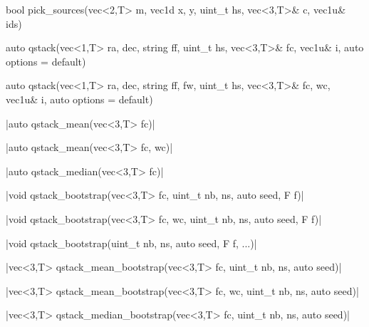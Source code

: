 \item {} \begin{cppcode}
bool pick_sources(vec<2,T> m, vec1d x, y, uint_t hs,
                  vec<3,T>& c, vec1u& ids)
\end{cppcode}

\item {} \begin{cppcode}
auto qstack(vec<1,T> ra, dec, string ff, uint_t hs, vec<3,T>& fc,
            vec1u& i, auto options = default)
\end{cppcode}

\begin{cppcode}
auto qstack(vec<1,T> ra, dec, string ff, fw, uint_t hs,
            vec<3,T>& fc, wc, vec1u& i, auto options = default)
\end{cppcode}

\item \cppinline|auto qstack_mean(vec<3,T> fc)| 

\cppinline|auto qstack_mean(vec<3,T> fc, wc)|

\item \cppinline|auto qstack_median(vec<3,T> fc)| 

\item \cppinline|void qstack_bootstrap(vec<3,T> fc, uint_t nb, ns, auto seed, F f)| 

\cppinline|void qstack_bootstrap(vec<3,T> fc, wc, uint_t nb, ns, auto seed, F f)|

\cppinline|void qstack_bootstrap(uint_t nb, ns, auto seed, F f, ...)|

\item \cppinline|vec<3,T> qstack_mean_bootstrap(vec<3,T> fc, uint_t nb, ns, auto seed)| 

\cppinline|vec<3,T> qstack_mean_bootstrap(vec<3,T> fc, wc, uint_t nb, ns, auto seed)|

\item \cppinline|vec<3,T> qstack_median_bootstrap(vec<3,T> fc, uint_t nb, ns, auto seed)| 
